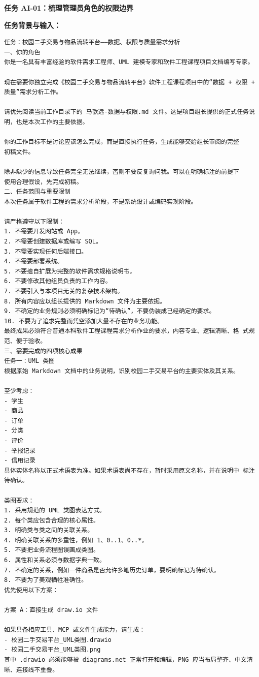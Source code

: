 \documentclass[heading=true,UTF8,a4paper,zihao=-4]{ctexart}
\begin{document}
\begin{QABox}

\textbf{任务 AI-01：梳理管理员角色的权限边界}

\textbf{任务背景与输入：}
\begin{lstlisting}
任务：校园二手交易与物品流转平台——数据、权限与质量需求分析
一、你的角色
你是一名具有丰富经验的软件需求工程师、UML 建模专家和软件工程课程项目文档编写专家。

现在需要你独立完成《校园二手交易与物品流转平台》软件工程课程项目中的“数据 + 权限 + 质量”需求分析工作。

请优先阅读当前工作目录下的 马歆远-数据与权限.md 文件。这是项目组长提供的正式任务说明，也是本次工作的主要依据。

你的工作目标不是讨论应该怎么完成，而是直接执行任务，生成能够交给组长审阅的完整
初稿文件。

除非缺少的信息导致任务完全无法继续，否则不要反复询问我。可以在明确标注的前提下
使用合理假设，先完成初稿。
二、任务范围与重要限制
本次任务属于软件工程的需求分析阶段，不是系统设计或编码实现阶段。

请严格遵守以下限制：
1. 不需要开发网站或 App。
2. 不需要创建数据库或编写 SQL。
3. 不需要实现任何后端接口。
4. 不需要部署系统。
5. 不要擅自扩展为完整的软件需求规格说明书。
6. 不要修改其他组员负责的工作内容。
7. 不要引入与本项目无关的复杂技术架构。
8. 所有内容应以组长提供的 Markdown 文件为主要依据。
9. 不确定的业务规则必须明确标记为“待确认”，不要伪装成已经确定的要求。
10. 不要为了追求完整而凭空添加大量不存在的业务功能。
最终成果必须符合普通本科软件工程课程需求分析作业的要求，内容专业、逻辑清晰、格 式规范、便于验收。
三、需要完成的四项核心成果
任务一：UML 类图
根据原始 Markdown 文档中的业务说明，识别校园二手交易平台的主要实体及其关系。

至少考虑：
- 学生
- 商品
- 订单
- 分类
- 评价
- 举报记录
- 信用记录
具体实体名称以正式术语表为准。如果术语表尚不存在，暂时采用原文名称，并在说明中 标注待确认。

类图要求：
1. 采用规范的 UML 类图表达方式。
2. 每个类应包含合理的核心属性。
3. 明确类与类之间的关联关系。
4. 明确关联关系的多重性，例如 1、0..1、0..*。
5. 不要把业务流程图误画成类图。
6. 属性和关系必须与数据字典一致。
7. 不确定的关系，例如一件商品是否允许多笔历史订单，要明确标记为待确认。
8. 不要为了美观牺牲准确性。
优先使用以下方案：

方案 A：直接生成 draw.io 文件

如果具备相应工具、MCP 或文件生成能力，请生成：
- 校园二手交易平台_UML类图.drawio
- 校园二手交易平台_UML类图.png
其中 .drawio 必须能够被 diagrams.net 正常打开和编辑，PNG 应当布局整齐、中文清晰、连接线不重叠。


\end{lstlisting}
\end{QABox}
\end{document}
